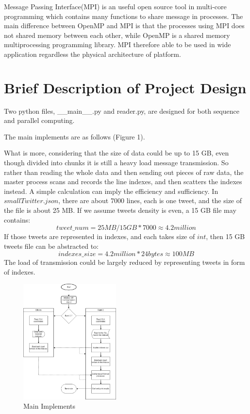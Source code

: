 \documentclass[11pt]{article}
\begin{document}
Message Passing  Interface(MPI) is an useful open source tool in multi-core programming which contains many functions to share message in processes. The main difference between OpenMP and MPI is that the processes using MPI does not shared memory between each other, while OpenMP is a shared memory multiprocessing programming library.  MPI therefore able to be used in wide application regardless the physical architecture of platform.



\section{Brief Description of Project Design}
Two python files, \_\_main\_\_.py and reader.py, are designed for both sequence and parallel computing.

The main implements are as follows (Figure 1).

What is more, considering that the size of data could be up to 15 GB, even though divided into chunks it is still a heavy load message transmission. So rather than reading the whole data and then sending out pieces of raw data, the master process scans and records the line indexes, and then scatters the indexes instead. A simple calculation can imply the efficiency and sufficiency. In $smallTwitter.json$, there are
about 7000 lines, each is one tweet, and the size of the file is about 25 MB. If we assume tweets density is even, a 15 GB file may contains: \[tweet\_num = 25MB / 15GB * 7000 \approx 4.2million\] If those tweets are represented in indexes, and each takes size of $int$, then 15 GB tweets file can be abstracted to: \[indexes\_size = 4.2million * 24bytes \approx 100MB \] The load of transmission could be largely reduced by representing tweets in form of indexes.
\begin{figure}[ht]
\includegraphics[width=0.45\textwidth]{process}
\caption{Main Implements}
\end{figure}
\end{document}
